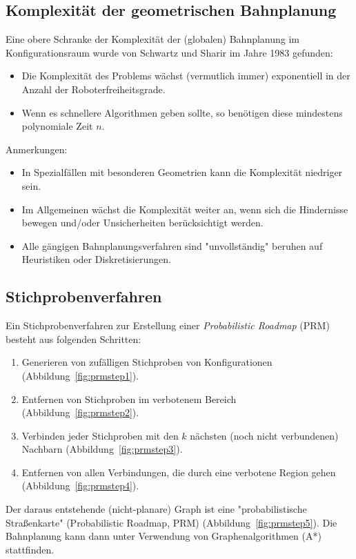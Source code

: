 		\subsection{Komplexität der geometrischen Bahnplanung}
			Eine obere Schranke der Komplexität der (globalen) Bahnplanung im Konfigurationsraum wurde von Schwartz und Sharir im Jahre 1983 gefunden:
			\begin{itemize}
				\item Die Komplexität des Problems wächst (vermutlich immer) exponentiell in der Anzahl der Roboterfreiheitsgrade.
				\item Wenn es schnellere Algorithmen geben sollte, so benötigen diese mindestens polynomiale Zeit \bzgl \(n\).
			\end{itemize}

			Anmerkungen:
			\begin{itemize}
				\item In Spezialfällen mit besonderen Geometrien kann die Komplexität niedriger sein.
				\item Im Allgemeinen wächst die Komplexität weiter an, wenn sich die Hindernisse bewegen und/oder Unsicherheiten berücksichtigt werden.
				\item Alle gängigen Bahnplanungsverfahren sind "unvollständig" \bzw beruhen auf Heuristiken oder Diskretisierungen.
			\end{itemize}

		\subsection{Stichprobenverfahren}
			Ein Stichprobenverfahren zur Erstellung einer \emph{Probabilistic Roadmap} (PRM) besteht aus folgenden Schritten:
			\begin{enumerate}
				\item Generieren von zufälligen Stichproben von Konfigurationen (Abbildung~\ref{fig:prmstep1}).
				\item Entfernen von Stichproben im verbotenem Bereich (Abbildung~\ref{fig:prmstep2}).
				\item Verbinden jeder Stichproben mit den \(k\) nächsten (noch nicht verbundenen) Nachbarn (Abbildung~\ref{fig:prmstep3}).
				\item Entfernen von allen Verbindungen, die durch eine verbotene Region gehen (Abbildung~\ref{fig:prmstep4}).
			\end{enumerate}
			Der daraus entstehende (\mglw nicht-planare) Graph ist eine "probabilistische Straßenkarte" (Probabilistic Roadmap, PRM) (Abbildung~\ref{fig:prmstep5}). Die Bahnplanung kann dann unter Verwendung von Graphenalgorithmen (\zB A*) stattfinden.

